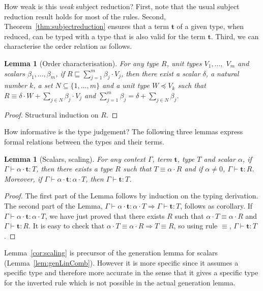 \documentclass[colorlinks=true,linkcolor=black,urlcolor=black,citecolor=blue,submission,copyright,creativecommons]{eptcs}
\newtheorem{lemma}[theorem]{Lemma}
\newcommand{\ve}[1]{\mathrm{\textbf{#1}}}
\newcommand{\type}{\colon\!}
\newcommand{\suj}[1]{\sum_{j=1}^{#1}}
\begin{document}
\noindent How weak is this {\em weak} subject reduction? First, note that the usual subject
reduction result holds for most of the rules. 
Second, Theorem~\ref{thm:subjectreduction} ensures that a term $\ve t$ of a
given type, when reduced, can be typed with a type that is also valid
for the term $\ve t$. 
Third, we can characterise the order relation as follows.
\begin{lemma}[Order characterisation]\label{lem:orderchar} For any type $R$, unit types $V_1,\dots,$ $V_m$ and scalars $\beta_1,\dots,\beta_m$, if $R\sqsubseteq\suj{m}\beta_j\cdot V_j$, then there exist a scalar $\delta$, a natural number $k$, a set $N\subseteq\{1,\dots,m\}$ and a unit type $W\preceq V_k$ such that $R\equiv\delta\cdot W+\sum_{j\in N}\beta_j\cdot V_j$ and $\suj{m}\beta_j=\delta+\sum_{j\in N}\beta_j$.
\end{lemma}
\begin{proof}
 Structural induction on $R$.
\end{proof}


How informative is the type judgement? The following three lemmas express formal relations between the types and their terms.

\begin{lemma}[Scalars, scaling]\label{lem:scalars}\label{cor:scaling}
  For any context $\Gamma$, term $\ve t$, type $T$ and scalar
  $\alpha$, if $\Gamma\vdash\alpha\cdot \ve{t}\type T$, then there
  exists a type $R$ such that $T\equiv\alpha\cdot R$ and if
  $\alpha\neq 0$, $\Gamma\vdash\ve{t}\type R$.  Moreover, if
  $\Gamma\vdash\alpha\cdot \ve{t}\type\alpha\cdot T$, then
  $\Gamma\vdash\ve{t}\type T$.
\end{lemma}
\begin{proof}
 The first part of the Lemma follows by induction on the typing derivation.
The second part of the Lemma, $\Gamma\vdash\alpha{\cdot}\ve t\type\alpha{\cdot}T\Rightarrow\Gamma\vdash\ve t\type T$, follows as corollary. If $\Gamma\vdash\alpha{\cdot}\ve t\type \alpha{\cdot}T$, we have just proved that there exists $R$ such that $\alpha{\cdot} T\equiv\alpha{\cdot} R$ and $\Gamma\vdash\ve{t}\type R$. It is easy to check that $\alpha{\cdot} T\equiv\alpha{\cdot} R\Rightarrow T\equiv R$, so using rule $\equiv$, $\Gamma\vdash\ve{t}\type T$.
\end{proof}


Lemma~\ref{cor:scaling} is precursor of the generation lemma for
scalars (Lemma~\ref{lem:genLinComb}). However it is more specific since it
assumes a specific type and therefore more accurate in the sense that
it gives a specific type for the inverted rule which is not possible
in the actual generation lemma. 
\end{document}
